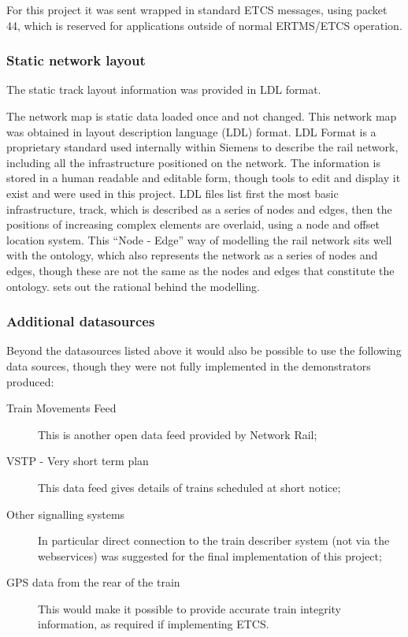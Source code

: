 For this project it was sent wrapped in standard ETCS messages, using packet 44, which is reserved for applications outside of normal ERTMS/ETCS operation.

    \subsubsection{Static network layout}
The static track layout information was provided in LDL format.

The network map is static data loaded once and not changed. This network map was obtained in layout description language (LDL) format. LDL Format is a proprietary standard used internally within Siemens to describe the rail network, including all the infrastructure positioned on the network. The information is stored in a human readable and editable form, though tools to edit and display it exist and were used in this project. LDL files list first the most basic infrastructure, track, which is described as a series of nodes and edges, then the positions of increasing complex elements are overlaid, using a node and offset location system. This ``Node - Edge'' way of modelling the rail network sits well with the ontology, which also represents the network as a series of nodes and edges, though these are not the same as the nodes and edges that constitute the ontology. \citet{Tutcher2015} sets out the rational behind the modelling.

    \subsubsection{Additional datasources}
Beyond the datasources listed above it would also be possible to use the following data sources, though they were not fully implemented in the demonstrators produced:
\begin{description}
    \item [Train Movements Feed] This is another open data feed provided by Network Rail;
    \item [VSTP - Very short term plan] This data feed gives details of trains scheduled at short notice;
    \item [Other signalling systems] In particular direct connection to the train describer system (not via the webservices) was suggested for the final implementation of this project;
    \item [GPS data from the rear of the train] This would make it possible to provide accurate train integrity information, as required if implementing ETCS.     
\end{description}

